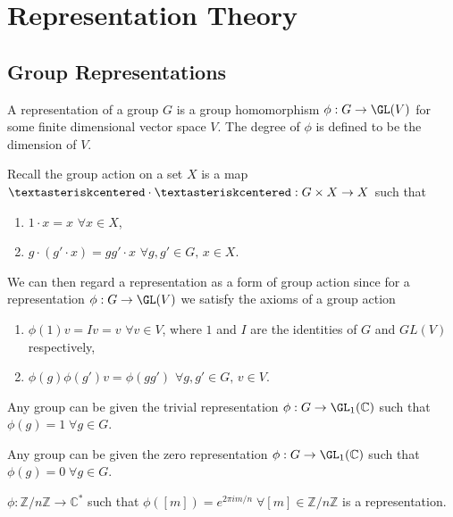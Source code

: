 \documentclass[../Project.tex]{subfiles}
\begin{document}
\newpage
\section{Representation Theory}
\subsection{Group Representations}
\begin{defi}
	A representation of a group $G$ is a group homomorphism $\phi : G \to \GL(V)$ for some finite dimensional vector space $V$. The degree of $\phi$ is defined to be the dimension of $V$.
\end{defi}

\begin{rema}
	Recall the group action on a set $X$ is a map $\textasteriskcentered \cdot \textasteriskcentered : G \times X \to X$ such that
	\begin{enumerate}
		\item $1 \cdot x = x$ $\forall x \in X$,
		\item $g \cdot (g' \cdot x) = gg' \cdot x$ $\forall g,g' \in G,\,x \in X$.
	\end{enumerate}

	We can then regard a representation as a form of group action since for a representation $\phi : G \to \GL(V)$ we satisfy the axioms of a group action
	\begin{enumerate}
		\item $\phi(1)v = Iv = v$ $\forall v \in V$, where $1$ and $I$ are the identities of $G$ and $GL(V)$ respectively,
		\item $\phi(g)\phi(g')v = \phi(gg')$ $\forall g,g' \in G,\,v \in V$.
	\end{enumerate}
\end{rema}

\begin{defi}
	Any group can be given the trivial representation $\phi : G \to \GL_1(\mathbb{C})$ such that $\phi(g) = 1 \;\forall g \in G$. 
\end{defi}

\begin{defi}
	Any group can be given the zero representation $\phi : G \to \GL_1(\mathbb{C})$ such that $\phi(g) = 0 \; \forall g \in G$.
\end{defi}

\begin{exam}[\cite{1}]
	$\phi : \mathbb{Z}/n\mathbb{Z} \to \mathbb{C}^*$ such that $\phi([m]) = e^{2\pi i m/n} \;\forall [m] \in \mathbb{Z}/n\mathbb{Z}$ is a representation.
\end{exam}
\end{document}
